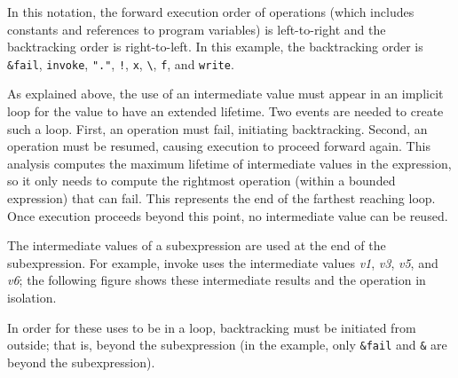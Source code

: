 In this notation, the forward execution order of operations (which
includes constants and references to program variables) is
left-to-right and the backtracking order is right-to-left. In this
example, the backtracking order is \texttt{\&fail}, \texttt{invoke},
\texttt{"."}, \texttt{!}, \texttt{x}, \texttt{\textbackslash},
\texttt{f}, and \texttt{write}.

As explained above, the use of an intermediate value must appear in an
implicit loop for the value to have an extended lifetime. Two events
are needed to create such a loop. First, an operation must fail,
initiating backtracking. Second, an operation must be resumed, causing
execution to proceed forward again. This analysis computes the maximum
lifetime of intermediate values in the expression, so it only needs to
compute the rightmost operation (within a bounded expression) that can
fail. This represents the end of the farthest reaching loop. Once
execution proceeds beyond this point, no intermediate value can be
reused.

The intermediate values of a subexpression are used at the end of the
subexpression. For example, invoke uses the intermediate values
\textit{v1}, \textit{v3}, \textit{v5}, and \textit{v6}; the following
figure shows these intermediate results and the operation in
isolation.


\begin{center}
\end{center}

In order for these uses to be in a loop, backtracking must be
initiated from outside; that is, beyond the subexpression (in the
example, only \texttt{\&fail} and \texttt{\&} are beyond the subexpression).

